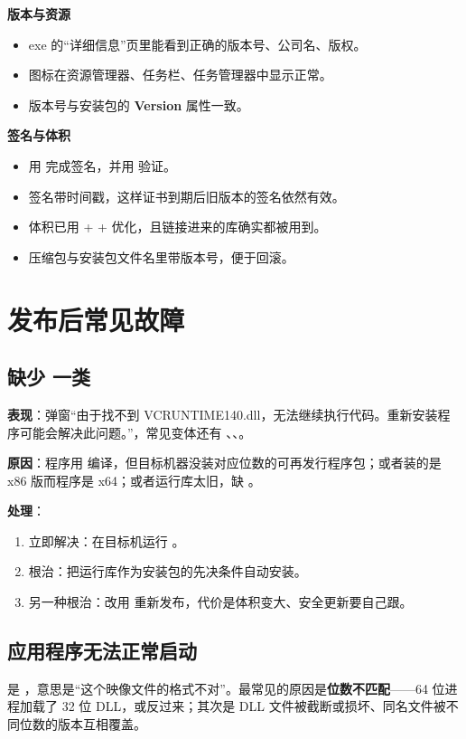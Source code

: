 \textbf{版本与资源}
\begin{itemize}
  \item[$\square$] exe 的“详细信息”页里能看到正确的版本号、公司名、版权。
  \item[$\square$] 图标在资源管理器、任务栏、任务管理器中显示正常。
  \item[$\square$] 版本号与安装包的 \textbf{Version} 属性一致。
\end{itemize}

\textbf{签名与体积}
\begin{itemize}
  \item[$\square$] 用  完成签名，并用  验证。
  \item[$\square$] 签名带时间戳，这样证书到期后旧版本的签名依然有效。
  \item[$\square$] 体积已用  +  +  优化，且链接进来的库确实都被用到。
  \item[$\square$] 压缩包与安装包文件名里带版本号，便于回滚。
\end{itemize}
\section{发布后常见故障}
\subsection{缺少  一类}
\textbf{表现}：弹窗“由于找不到 VCRUNTIME140.dll，无法继续执行代码。重新安装程序可能会解决此问题。”，常见变体还有 、、。

\textbf{原因}：程序用  编译，但目标机器没装对应位数的可再发行程序包；或者装的是 x86 版而程序是 x64；或者运行库太旧，缺 。

\textbf{处理}：
\begin{enumerate}
  \item 立即解决：在目标机运行 。
  \item 根治：把运行库作为安装包的先决条件自动安装。
  \item 另一种根治：改用  重新发布，代价是体积变大、安全更新要自己跟。
\end{enumerate}
\subsection{应用程序无法正常启动 }
 是 ，意思是“这个映像文件的格式不对”。最常见的原因是\textbf{位数不匹配}——64 位进程加载了 32 位 DLL，或反过来；其次是 DLL 文件被截断或损坏、同名文件被不同位数的版本互相覆盖。

